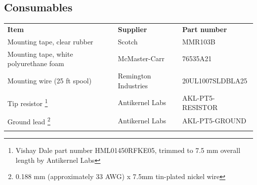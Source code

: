 \documentclass[11pt]{article}
\newcommand{\thinhline}{\Xhline{1\arrayrulewidth}}
\newcommand{\thickhline}{\Xhline{2.5\arrayrulewidth}}
\begin{document}
\subsection{Consumables}

\begin{tabularx}{16cm}{llX}
\thickhline
\textbf{Item} & \textbf{Supplier} & \textbf{Part number} \\
\thickhline
Mounting tape, clear rubber & Scotch & MMR103B \\
\thinhline
Mounting tape, white polyurethane foam & McMaster-Carr & 76535A21 \\
\thinhline
Mounting wire (25 ft spool) & Remington Industries & 20UL1007SLDBLA25 \\
\thinhline
Tip resistor \footnote{Vishay Dale part number HML01450RFKE05, trimmed to 7.5 mm overall length by Antikernel Labs}
	& Antikernel Labs & AKL-PT5-RESISTOR \\
\thinhline
Ground lead \footnote{0.188 mm (approximately 33 AWG) x 7.5mm tin-plated nickel wire} & Antikernel Labs & AKL-PT5-GROUND \\
\thickhline
\end{tabularx}
\end{document}
